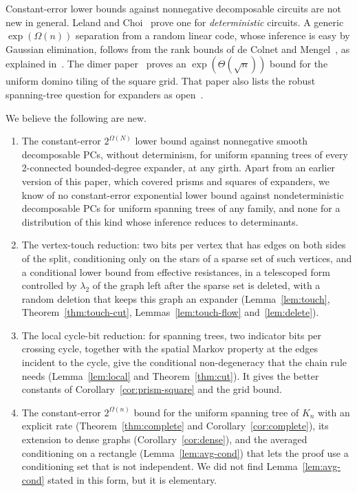 Constant-error lower bounds against nonnegative decomposable circuits are not new in general. Leland and Choi~\cite{LelandChoi25} prove one for \emph{deterministic} circuits. A generic $\exp(\Omega(n))$ separation from a random linear code, whose inference is easy by Gaussian elimination, follows from the rank bounds of de Colnet and Mengel~\cite{DeColnetMengel20}, as explained in~\cite[Sec.~10.4]{Blaschke26Dimers}. The dimer paper~\cite{Blaschke26Dimers} proves an $\exp(\Theta(\sqrt n))$ bound for the uniform domino tiling of the square grid. That paper also lists the robust spanning-tree question for expanders as open~\cite[Sec.~11, problem~5]{Blaschke26Dimers}.

We believe the following are new.
\begin{enumerate}[label=(\roman*)]
\item The constant-error $2^{\Omega(N)}$ lower bound against nonnegative smooth decomposable PCs, without determinism, for uniform spanning trees of every 2-connected bounded-degree expander, at any girth. Apart from an earlier version of this paper, which covered prisms and squares of expanders, we know of no constant-error exponential lower bound against nondeterministic decomposable PCs for uniform spanning trees of any family, and none for a distribution of this kind whose inference reduces to determinants.
\item The vertex-touch reduction: two bits per vertex that has edges on both sides of the split, conditioning only on the stars of a sparse set of such vertices, and a conditional lower bound from effective resistances, in a telescoped form controlled by $\lambda_2$ of the graph left after the sparse set is deleted, with a random deletion that keeps this graph an expander (Lemma~\ref{lem:touch}, Theorem~\ref{thm:touch-cut}, Lemmas~\ref{lem:touch-flow} and~\ref{lem:delete}).
\item The local cycle-bit reduction: for spanning trees, two indicator bits per crossing cycle, together with the spatial Markov property at the edges incident to the cycle, give the conditional non-degeneracy that the chain rule needs (Lemma~\ref{lem:local} and Theorem~\ref{thm:cut}). It gives the better constants of Corollary~\ref{cor:prism-square} and the grid bound.
\item The constant-error $2^{\Omega(n)}$ bound for the uniform spanning tree of $K_n$ with an explicit rate (Theorem~\ref{thm:complete} and Corollary~\ref{cor:complete}), its extension to dense graphs (Corollary~\ref{cor:dense}), and the averaged conditioning on a rectangle (Lemma~\ref{lem:avg-cond}) that lets the proof use a conditioning set that is not independent. We did not find Lemma~\ref{lem:avg-cond} stated in this form, but it is elementary.

\end{enumerate}
